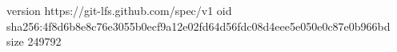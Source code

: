 version https://git-lfs.github.com/spec/v1
oid sha256:4f8d6b8e8c76e3055b0ecf9a12e02fd64d56fdc08d4eee5e050e0c87e0b966bd
size 249792
